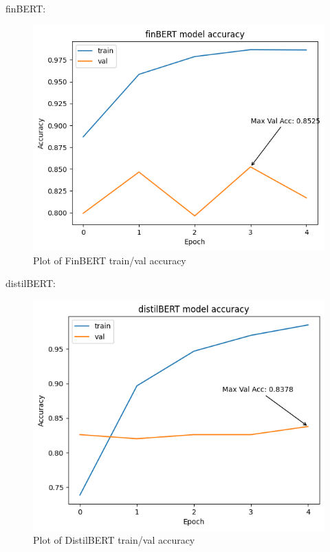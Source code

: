 \newline
\newpage
finBERT:
\begin{figure}[!ht]
    \centering
    \includegraphics[width=12cm]{./images/plot_finBERT.png}
    \caption{Plot of FinBERT train/val accuracy}
\end{figure}
\newline
distilBERT:
\begin{figure}[!ht]
    \centering
    \includegraphics[width=12cm]{./images/plot_distilBERT.png}
    \caption{Plot of DistilBERT train/val accuracy}
\end{figure}

\newpage

